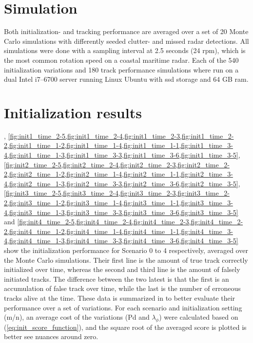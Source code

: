 \section{Simulation}
Both initialization- and tracking performance are averaged over a set of 20 Monte Carlo simulations with differently seeded clutter- and missed radar detections. All simulations were done with a sampling interval at 2.5 seconds (24 \gls{rpm}), which is the most common rotation speed on a coastal maritime radar. Each of the 540 initialization variations and 180 track performance simulations where run on a dual Intel i7--6700 server running Linux Ubuntu with \gls{ssd} storage and 64 GB \gls{ram}.

\section{Initialization results}
, \cref{fig:init1_time_2-5,fig:init1_time_2-4,fig:init1_time_2-3,fig:init1_time_2-2,fig:init1_time_1-2,fig:init1_time_1-4,fig:init1_time_1-1,fig:init1_time_3-4,fig:init1_time_1-3,fig:init1_time_3-3,fig:init1_time_3-6,fig:init1_time_3-5}, \cref{fig:init2_time_2-5,fig:init2_time_2-4,fig:init2_time_2-3,fig:init2_time_2-2,fig:init2_time_1-2,fig:init2_time_1-4,fig:init2_time_1-1,fig:init2_time_3-4,fig:init2_time_1-3,fig:init2_time_3-3,fig:init2_time_3-6,fig:init2_time_3-5}, \cref{fig:init3_time_2-5,fig:init3_time_2-4,fig:init3_time_2-3,fig:init3_time_2-2,fig:init3_time_1-2,fig:init3_time_1-4,fig:init3_time_1-1,fig:init3_time_3-4,fig:init3_time_1-3,fig:init3_time_3-3,fig:init3_time_3-6,fig:init3_time_3-5} and \cref{fig:init4_time_2-5,fig:init4_time_2-4,fig:init4_time_2-3,fig:init4_time_2-2,fig:init4_time_1-2,fig:init4_time_1-4,fig:init4_time_1-1,fig:init4_time_3-4,fig:init4_time_1-3,fig:init4_time_3-3,fig:init4_time_3-6,fig:init4_time_3-5} show the initialization performance for Scenario 0 to 4 respectively, averaged over the Monte Carlo simulations. Their first line is the amount of true track correctly initialized over time, whereas the second and third line is the amount of falsely initiated tracks. The difference between the two latest is that the first is an accumulation of false track over time, while the last is the number of erroneous tracks alive at the time. These data is summarized in  to better evaluate their performance over a set of variations. For each scenario and initialization setting (m/n), an average cost of the variations (\gls{Pd} and \(\lambda_\phi\)) were calculated based on (\ref{eq:init_score_function}), and the square root of the averaged score is plotted is better see nuances around zero. 
